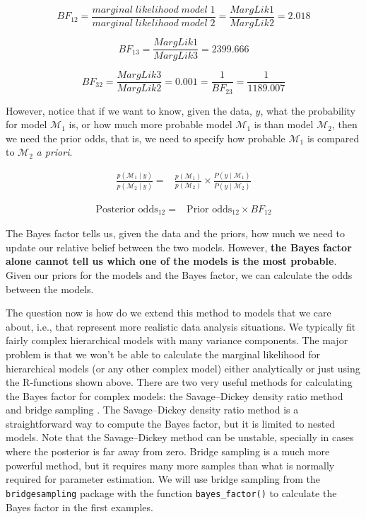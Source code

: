 \documentclass[12pt,]{krantz}
\theoremstyle{definition}
\theoremstyle{definition}
\theoremstyle{definition}
\theoremstyle{remark}
\begin{document}
\begin{equation}
BF_{12} = \frac{marginal \; likelihood \; model \; 1}{marginal \; likelihood \; model \; 2} = \frac{MargLik1}{MargLik2} = 2.018 
\end{equation}

\begin{equation}
BF_{13} = \frac{MargLik1}{MargLik3}=  2399.666 
\end{equation}

\begin{equation}
BF_{32} = \frac{MargLik3}{MargLik2} =  0.001 = \frac{1}{BF_{23}} =  \frac{1}{1189.007 }
\end{equation}

However, notice that if we want to know, given the data, \(y\), what the
probability for model \(\mathcal{M}_1\) is, or how much more probable
model \(\mathcal{M}_1\) is than model \(\mathcal{M}_2\), then we need
the prior odds, that is, we need to specify how probable
\(\mathcal{M}_1\) is compared to \(\mathcal{M}_2\) \emph{a priori}.

\begin{align}
\frac{p(\mathcal{M}_1 \mid y)}{p(\mathcal{M}_2 \mid y)} =& \frac{p(\mathcal{M}_1)}{p(\mathcal{M}_2)} \times \frac{P(y \mid \mathcal{M}_1)}{P(y \mid \mathcal{M}_2)}
\end{align}

\begin{align}
\text{Posterior odds}_{12} = & \text{Prior odds}_{12} \times BF_{12}
\end{align}

The Bayes factor tells us, given the data and the priors, how much we
need to update our relative belief between the two models. However,
\textbf{the Bayes factor alone cannot tell us which one of the models is
the most probable}. Given our priors for the models and the Bayes
factor, we can calculate the odds between the models.

The question now is how do we extend this method to models that we care
about, i.e., that represent more realistic data analysis situations. We
typically fit fairly complex hierarchical models with many variance
components. The major problem is that we won't be able to calculate the
marginal likelihood for hierarchical models (or any other complex model)
either analytically or just using the R-functions shown above. There are
two very useful methods for calculating the Bayes factor for complex
models: the Savage--Dickey density ratio method
\citep{DickeyLientz1970, wagenmakers2010BayesianHypothesisTesting} and
bridge sampling
\citep{bennettEfficientEstimationFree1976, mengSimulatingRatiosNormalizing1996}.
The Savage--Dickey density ratio method is a straightforward way to
compute the Bayes factor, but it is limited to nested models. Note that
the Savage--Dickey method can be unstable, specially in cases where the
posterior is far away from zero. Bridge sampling is a much more powerful
method, but it requires many more samples than what is normally required
for parameter estimation. We will use bridge sampling from the
\texttt{bridgesampling}
\citep[\citet{gronauBridgesamplingPackageEstimating2017}]{gronauTutorialBridgeSampling2017}
package with the function \texttt{bayes\_factor()} to calculate the
Bayes factor in the first examples.
\end{document}
